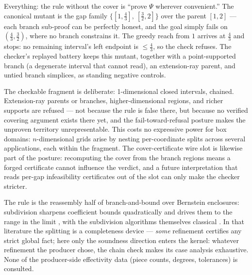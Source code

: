 \begin{bremark}
\label{rem:sd-gap}
Everything: the rule without the cover is ``prove $\Psi$ wherever
convenient.'' The canonical mutant is the gap family
$\{[1, \tfrac{4}{3}],\ [\tfrac{3}{2}, 2]\}$ over the parent
$[1, 2]$ --- each branch sub-proof can be perfectly honest, and the goal
simply fails on $(\tfrac{4}{3}, \tfrac{3}{2})$, where no branch
constrains it. The greedy reach from $1$ arrives at $\tfrac{4}{3}$ and
stops: no remaining interval's left endpoint is $\leq \tfrac{4}{3}$,
so the check refuses. The checker's replayed battery keeps this mutant,
together with a point-supported branch (a degenerate interval that
cannot read), an extension-ray parent, and untied branch simplices, as
standing negative controls.
\end{bremark}

\begin{bremark}\label{rem:sd-fragment}
The checkable fragment is deliberate: 1-dimensional closed intervals,
chained. Extension-ray parents or branches, higher-dimensional regions,
and richer supports are refused --- not because the rule is false there,
but because no verified covering argument exists there yet, and the
fail-toward-refusal posture makes the unproven territory
unrepresentable. This costs no expressive power for box domains:
$n$-dimensional grids arise by nesting per-coordinate splits across
several applications, each within the fragment. The cover-certificate
wire slot is likewise part of the posture: recomputing the cover from
the branch regions means a forged certificate cannot influence the
verdict, and a future interpretation that reads per-gap infeasibility
certificates out of the slot can only make the checker stricter.
\end{bremark}

\begin{bremark}
The rule is the reassembly half of branch-and-bound over Bernstein
enclosures: subdivision sharpens coefficient bounds quadratically and
drives them to the range in the limit \cite{garloff1986}, with the
subdivision algorithms themselves classical
\cite{decasteljau1959,laneriesenfeld1980}. In that literature the
splitting is a completeness device --- \emph{some} refinement certifies
any strict global fact; here only the soundness direction enters the
kernel: whatever refinement the producer chose, the chain check makes
its case analysis exhaustive. None of the producer-side effectivity
data (piece counts, degrees, tolerances) is consulted.
\end{bremark}

